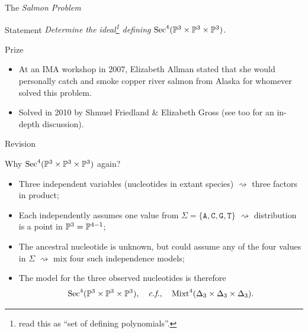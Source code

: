 \begin{frame}{The \emph{Salmon Problem}}

\begin{block}{Statement}
    \emph{Determine the ideal\footnote{read this as ``set of defining polynomials''.} defining $\operatorname{Sec}^{4}(\mathbb{P}^{3} \times \mathbb{P}^{3} \times \mathbb{P}^{3})$.}
\end{block}

\begin{block}{Prize}
    \begin{itemize}
    \item At an IMA workshop in 2007, Elizabeth Allman stated that she would personally catch and smoke copper river salmon from Alaska for whomever solved this problem. 
    \item Solved in 2010 by Shmuel Friedland \& Elizabeth Gross \cite{SFEG2012} (see \cite{DBLO2011} too for an in-depth discussion).
    \end{itemize}
\end{block}

\end{frame}

\begin{frame}{Revision}

Why $\operatorname{Sec}^{4}(\mathbb{P}^{3} \times \mathbb{P}^{3} \times \mathbb{P}^{3})$ again?

\begin{itemize}
    \item Three independent variables (nucleotides in extant species) $\rightsquigarrow$ three factors in product;
    \item Each independently assumes one value from $\Sigma = \{ \texttt{A}, \texttt{C}, \texttt{G}, \texttt{T} \}$ $\rightsquigarrow$ distribution is a point in $\mathbb{P}^{3} = \mathbb{P}^{4-1}$;
    \item The ancestral nucleotide is unknown, but could assume any of the four values in $\Sigma$ $\rightsquigarrow$ mix four such independence models;
    \item The model for the three observed nucleotides is therefore
    \begin{equation*}
            \operatorname{Sec}^{4}(\mathbb{P}^{3} \times \mathbb{P}^{3} \times \mathbb{P}^{3}),\quad \text{\emph{c.f.},} \quad \operatorname{Mixt}^{4}(\Delta_{3} \times \Delta_{3} \times \Delta_{3}).
    \end{equation*}
\end{itemize}
\end{frame}